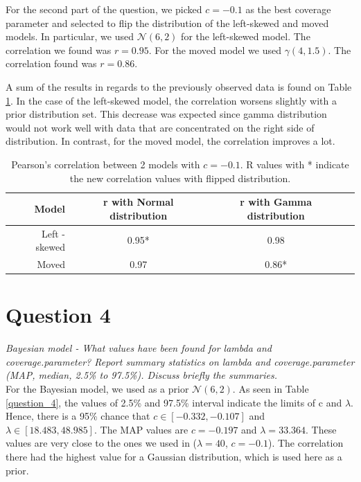 \documentclass[11pt,a4paper,oneside]{article}
\begin{document}
For the second part of the question, we picked $c = -0.1$ as the best coverage parameter and selected to flip the distribution of the left-skewed and moved models. In particular, we used $\mathcal{N}(6, 2)$ for the left-skewed model. The correlation we found was $r = 0.95$. For the moved model we used $\mathcal{\gamma}(4, 1.5)$. The correlation found was $r = 0.86$.

A sum of the results in regards to the previously observed data is found on Table \ref{question_3_flipped}. In the case of the left-skewed model, the correlation worsens slightly with a prior distribution set. This decrease was expected since gamma distribution would not work well with data that are concentrated on the right side of distribution. In contrast, for the moved model, the correlation improves a lot. 

\begin{table}[ht]
\centering
\begin{tabular}{rccr}
  \hline
 Model & r with Normal distribution & r with Gamma distribution\\ 
  \hline
    Left - skewed & 0.95* & 0.98 \\ 
    Moved & 0.97 & 0.86* \\ 
   \hline
\end{tabular}
\caption{Pearson's correlation between 2 models with $c = -0.1$. R values with * indicate the new correlation values with flipped distribution.}
\label{question_3_flipped}
\end{table}

\section{Question 4} 
\label{Question 4}
\textit{Bayesian model - What values have been found for lambda and coverage.parameter? Report summary statistics on lambda and coverage.parameter (MAP, median, 2.5\% to 97.5\%). Discuss briefly the summaries.}\\

For the Bayesian model, we used as a prior $\mathcal{N}(6, 2)$. As seen in Table \ref{question_4},  the values of 2.5\% and 97.5\% interval indicate the limits of c and $\lambda$. Hence, there is a 95\% chance that $ c \in [-0.332, -0.107]$ and $\lambda \in [18.483, 48.985]$. The MAP values are $c = -0.197$ and $\lambda = 33.364$. These values are very close to the ones we used in  ($\lambda = 40$, $c = -0.1$). The correlation there had the highest value for a Gaussian distribution, which is used here as a prior.
\end{document}
